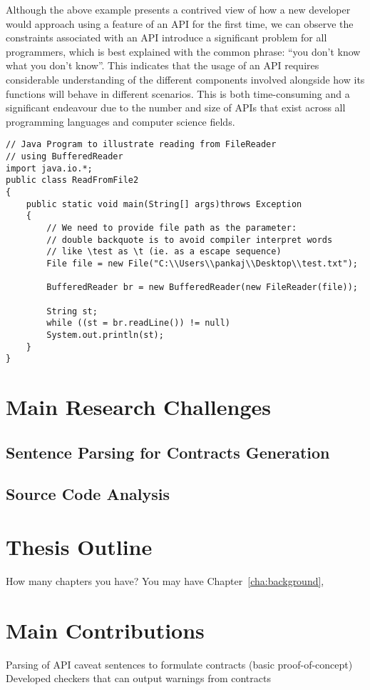 Although the above example presents a contrived view of how a new developer would approach using a feature of an API for the first time, we can observe the constraints associated with an API introduce a significant problem for all programmers, which is best explained with the common phrase: ``you don't know what you don't know''. This indicates that the usage of an API requires considerable understanding of the different components involved alongside how its functions will behave in different scenarios. This is both time-consuming and a significant endeavour due to the number and size of APIs that exist across all programming languages and computer science fields.

\begin{lstlisting}[tabsize=4,caption={File reading java code example from GeeksforGeeks},label={lst:code-example}]
// Java Program to illustrate reading from FileReader 
// using BufferedReader 
import java.io.*; 
public class ReadFromFile2 
{ 
	public static void main(String[] args)throws Exception 
	{ 
		// We need to provide file path as the parameter: 
		// double backquote is to avoid compiler interpret words 
		// like \test as \t (ie. as a escape sequence) 
		File file = new File("C:\\Users\\pankaj\\Desktop\\test.txt"); 
		
		BufferedReader br = new BufferedReader(new FileReader(file)); 
		
		String st; 
		while ((st = br.readLine()) != null) 
		System.out.println(st); 
	} 
} 
\end{lstlisting}

\section{Main Research Challenges}
\label{sec:mainresearchchallenges}

\subsection{Sentence Parsing for Contracts Generation}

\subsection{Source Code Analysis}

\section{Thesis Outline}
\label{sec:outline}
How many chapters you have? You may have Chapter~\ref{cha:background},

\section{Main Contributions}
Parsing of API caveat sentences to formulate contracts (basic proof-of-concept)
Developed checkers that can output warnings from contracts
